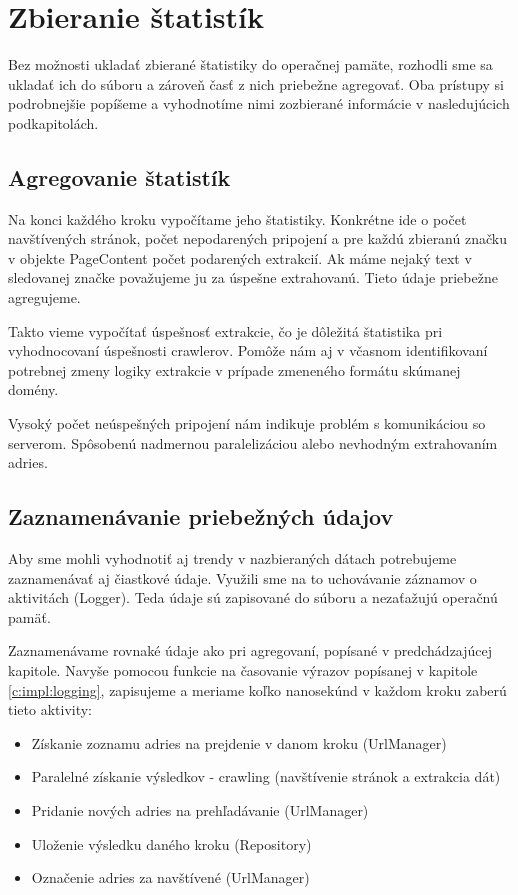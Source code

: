 \section{Zbieranie štatistík} \label{c:collectingStats}
Bez možnosti ukladať zbierané štatistiky do operačnej pamäte, rozhodli sme sa ukladať ich do súboru a zároveň časť z nich priebežne agregovať. Oba prístupy si podrobnejšie popíšeme a vyhodnotíme nimi zozbierané informácie v nasledujúcich podkapitolách. 

\subsection{Agregovanie štatistík} \label{c:agrStats}
Na konci každého kroku vypočítame jeho štatistiky. Konkrétne ide o počet navštívených stránok, počet nepodarených pripojení a pre každú zbieranú značku v objekte PageContent počet podarených extrakcií. Ak máme nejaký text v sledovanej značke považujeme ju za úspešne extrahovanú. Tieto údaje priebežne agregujeme. 

Takto vieme vypočítať úspešnosť extrakcie, čo je dôležitá štatistika pri vyhodnocovaní úspešnosti crawlerov. Pomôže nám aj v včasnom identifikovaní potrebnej zmeny logiky extrakcie v prípade zmeneného formátu skúmanej domény. 

Vysoký počet neúspešných pripojení nám indikuje problém s komunikáciou so serverom. Spôsobenú nadmernou paralelizáciou alebo nevhodným extrahovaním adries. 

\subsection{Zaznamenávanie priebežných údajov}
Aby sme mohli vyhodnotiť aj trendy v nazbieraných dátach potrebujeme zaznamenávať aj čiastkové údaje. Využili sme na to uchovávanie záznamov o aktivitách (Logger). Teda údaje sú zapisované do súboru a nezaťažujú operačnú pamäť.

Zaznamenávame rovnaké údaje ako pri agregovaní, popísané v predchádzajúcej kapitole. Navyše pomocou funkcie na časovanie výrazov popísanej v kapitole \ref{c:impl:logging}, zapisujeme a meriame koľko nanosekúnd v každom kroku zaberú tieto aktivity:

\begin{itemize}
    \item Získanie zoznamu adries na prejdenie v danom kroku (UrlManager)
    \item Paralelné získanie výsledkov - crawling (navštívenie stránok a extrakcia dát)
    \item Pridanie nových adries na prehľadávanie (UrlManager)
    \item Uloženie výsledku daného kroku (Repository)
    \item Označenie adries za navštívené (UrlManager)
\end{itemize}

